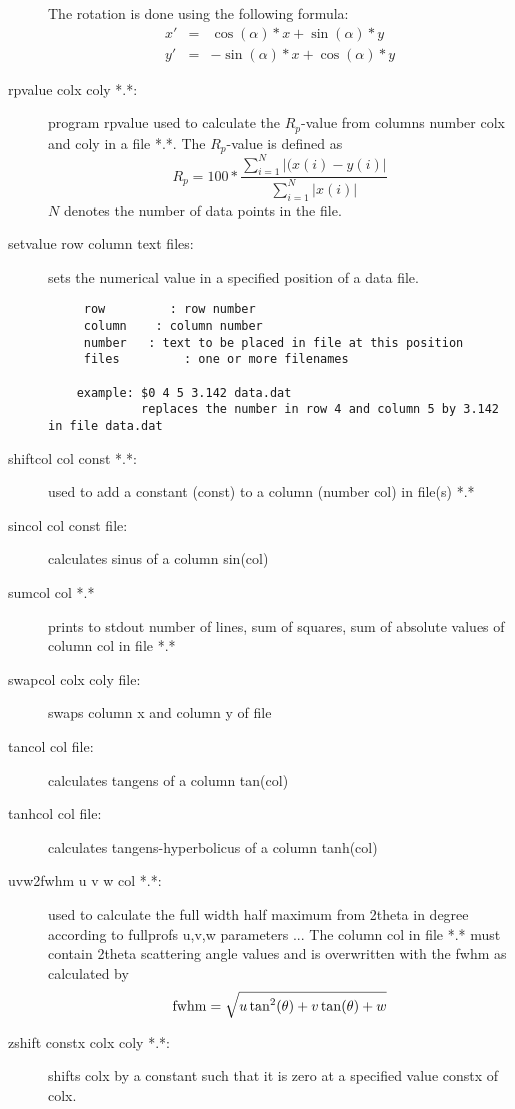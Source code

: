 \begin{description}
 The rotation is done using the following formula:
\begin{eqnarray}
 x'&= &\cos(\alpha)*x+\sin(\alpha)*y \nonumber \\
 y'&=&-\sin(\alpha)*x+\cos(\alpha)*y
\end{eqnarray}
\item [\prg rpvalue\index{rpvalue} colx coly  *.*:]  program rpvalue  used to %
calculate 
                       the $R_p$-value from columns number colx and coly 
		       in a file *.*. The $R_p$-value is defined as
		       \begin{equation}
		       R_p= 100*\frac{\sum_{i=1}^{N} |(x(i)-y(i)|}{\sum_{i=1}^{N}|x(i)|}
		       \end{equation}
                       $N$ denotes the number of data points in the file.
\item [\prg setvalue\index{setvalue} row column text files:] sets the numerical value in a specified position of a data file.

\begin{verbatim}
     row         : row number
     column    : column number
     number   : text to be placed in file at this position
     files         : one or more filenames

    example: $0 4 5 3.142 data.dat
             replaces the number in row 4 and column 5 by 3.142 in file data.dat
\end{verbatim}
\item [\prg shiftcol\index{shiftcol} col const *.*:] used to add a constant (const) to a column %
(number col) in file(s) *.*
\item [\prg sincol\index{sincol} col const file:] calculates sinus of a column sin(col) 
\item [\prg sumcol\index{sumcol} col *.*] prints to stdout number of lines, sum of squares, sum %
of absolute values of column col in file *.*
\item [\prg swapcol\index{swapcol} colx coly file:] swaps column x and column y of file
\item [\prg tancol\index{tancol} col file:] calculates tangens of a column tan(col)
\item [\prg tanhcol\index{tanhcol} col file:] calculates tangens-hyperbolicus of a column tanh(col)
\item [\prg uvw2fwhm\index{uvw2fwhm} u v w col *.*:] used to calculate the full
                   width half maximum from
                   2theta in degree according to fullprofs u,v,w parameters ...
                  The column col in file *.* must contain 2theta scattering angle
                 values and is overwritten with the fwhm as calculated by
                  \begin{equation}
                     {\rm  fwhm }= \sqrt {u \tan^2(\theta) + v \tan(\theta) + w}
                \end{equation}
\item [\prg zshift\index{zshift} constx colx coly *.*:] shifts colx by a constant such that it %
is zero at a specified value constx of colx. 
\end{description}

